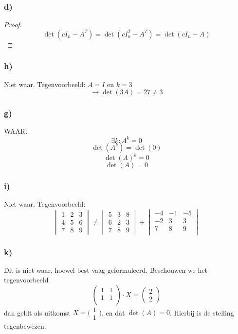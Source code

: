 \documentclass[lineaire_algebra_oplossingen.tex]{subfiles}
\begin{document}
\subsubsection*{d)}
\begin{proof}
\[
\det(cI_n - A^T) = \det(cI_n^T - A^T) = \det(cI_n - A)
\]
\end{proof}

\subsubsection*{h)}
Niet waar. Tegenvoorbeeld: $A=I$ en $k=3$
\[
\rightarrow \det(3A) = 27 \neq 3
\]
\subsubsection*{g)}
WAAR.
\[
\exists k: A^k = 0
\]
\[
\det(A^k) = \det(0)
\]
\[
\det(A)^k = 0
\]
\[
\det(A) = 0
\]

\subsubsection*{i)}
Niet waar. Tegenvoorbeeld: 
\[
    \begin{vmatrix}
        1 & 2 & 3\\
        4 & 5 & 6\\
        7 & 8 & 9
    \end{vmatrix} \neq
    \begin{vmatrix}
        5 & 3 & 8\\
        6 & 2 & 3\\
        7 & 8 & 9
    \end{vmatrix} + 
    \begin{vmatrix}
        -4 & -1 & -5\\
        -2 & 3 & 3\\
        7 & 8 & 9\\
    \end{vmatrix}
\]


\subsubsection*{k)}

Dit is niet waar, hoewel best vaag geformuleerd. Beschouwen we het tegenvoorbeeld
\[
\begin{pmatrix}
1 & 1\\
1 & 1\\
\end{pmatrix}
\cdot X = 
\begin{pmatrix}
2\\
2
\end{pmatrix}
\]
dan geldt als uitkomst $X = \bigl(\begin{smallmatrix} 1\\ 1 \end{smallmatrix} \bigr)$, en dat $\det(A) = 0$. Hierbij is de stelling tegenbewezen.
\end{document}
